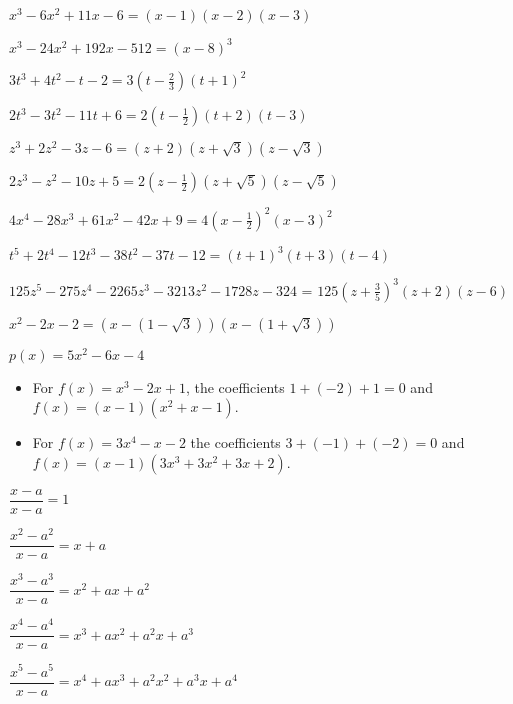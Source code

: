\begin{exenum}

\item $x^{3} - 6x^{2} + 11x - 6 = (x - 1)(x - 2)(x - 3)$
\item $x^{3} - 24x^{2} + 192x - 512 = (x - 8)^{3}$
\item $3t^{3} + 4t^{2} - t - 2 = 3\left(t - \frac{2}{3}\right)(t + 1)^{2}$

\item $2t^3-3t^2-11t+6 = 2\left(t-\frac{1}{2}\right)(t+2)(t-3)$

\item $z^3+2z^2-3z-6 = (z+2)(z+\sqrt{3})(z-\sqrt{3})$
\item $2z^3-z^2-10z+5=2\left(z-\frac{1}{2}\right)(z+\sqrt{5})(z-\sqrt{5})$

\item $4x^{4} - 28x^{3} + 61x^{2} - 42x + 9 = 4\left(x - \frac{1}{2} \right)^{2}(x - 3)^{2}$

\item  $t^5+2t^4-12t^3-38t^2-37t-12 = (t+1)^3(t+3)(t-4)$

\item $125z^{5} - 275z^{4} - 2265z^{3} - 3213z^{2} - 1728z - 324$ = $125\left(z + \frac{3}{5} \right)^{3}(z + 2)(z - 6)$


\item $x^{2} - 2x - 2 = (x - (1 - \sqrt{3}))(x - (1 + \sqrt{3}))$

\item $p(x) = 5x^{2} - 6x - 4$

\addtocounter{enumi}{2}

\item  \begin{itemize}

\item For $f(x) = x^3 - 2x + 1$, the coefficients $1+(-2) + 1 = 0$ and $f(x) = (x-1)(x^2+x-1)$.

\item  For $f(x) = 3x^4-x-2$ the coefficients $3+(-1)+(-2) = 0$ and $f(x) = (x-1)(3x^3+3x^2+3x+2)$.

\end{itemize}

\item  \begin{shortitemize}
\item $\dfrac{x - a}{x-a} = 1$  
\item $\dfrac{x^2 - a^2}{x-a} = x+a$ 
\item $\dfrac{x^3 - a^3}{x-a} = x^2+ax+a^2$ 
\item $\dfrac{x^4 - a^4}{x-a} = x^3 + ax^2 + a^2x + a^3$ 
\item $\dfrac{x^5 - a^5}{x-a} = x^4+ax^3 + a^2x^2+a^3x+a^4$ 
\end{shortitemize}


\end{exenum}
